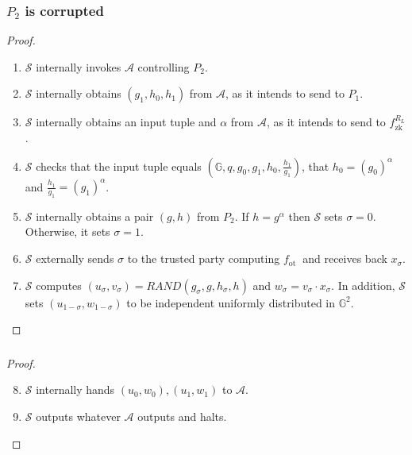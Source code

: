 \documentclass{beamer}
\begin{document}
    \begin{frame}
        \frametitle{$P_{2}$ is corrupted}
    
        \begin{proof}
            \begin{enumerate}
                \item  $\mathcal{S}$ internally invokes $\mathcal{A}$ controlling $P_{2}$.
                \item $\mathcal{S}$ internally obtains $\left(g_{1}, h_{0}, h_{1}\right)$ from $\mathcal{A}$, as it intends to send to $P_{1}$.
                \item $\mathcal{S}$ internally obtains an input tuple and $\alpha$ from $\mathcal{A}$, as it intends to send to $f_{\mathrm{zk}}^{R_{L}}$.
                \item $\mathcal{S}$ checks that the input tuple equals $\left(\mathbb{G}, q, g_{0}, g_{1}, h_{0}, \frac{h_{1}}{g_{1}}\right)$, that $h_{0}=\left(g_{0}\right)^{\alpha}$ and $\frac{h_{1}}{g_{1}}=\left(g_{1}\right)^{\alpha}$. 
                \item $\mathcal{S}$ internally obtains a pair $(g, h)$ from $P_{2}$. If $h=g^{\alpha}$ then $\mathcal{S}$ sets $\sigma=0$. Otherwise, it sets $\sigma=1$.
                \item $\mathcal{S}$ externally sends $\sigma$ to the trusted party computing $f_{\text {ot }}$ and receives back $x_{\sigma} .$ 
                \item $\mathcal{S}$ computes $\left(u_{\sigma}, v_{\sigma}\right)=R A N D\left(g_{\sigma}, g, h_{\sigma}, h\right)$ and $w_{\sigma}=v_{\sigma} \cdot x_{\sigma} .$ In addition, $\mathcal{S}$ sets $\left(u_{1-\sigma}, w_{1-\sigma}\right)$ to be independent uniformly distributed in $\mathbb{G}^{2}$.
            \end{enumerate}
        \end{proof}
    
    \end{frame}

    \begin{frame}
        \frametitle{}
    
        \begin{proof}
            \begin{enumerate}
                \setcounter{enumi}{7}
                \item $\mathcal{S}$ internally hands $\left(u_{0}, w_{0}\right),\left(u_{1}, w_{1}\right)$ to $\mathcal{A}$.
                \item $\mathcal{S}$ outputs whatever $\mathcal{A}$ outputs and halts.
            \end{enumerate}
        \end{proof}
    
    \end{frame}
\end{document}
